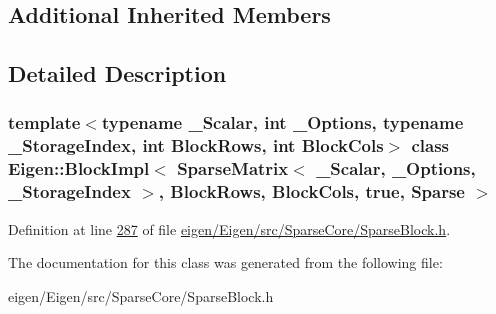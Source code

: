 \subsection*{Additional Inherited Members}


\subsection{Detailed Description}
\subsubsection*{template$<$typename \+\_\+\+Scalar, int \+\_\+\+Options, typename \+\_\+\+Storage\+Index, int Block\+Rows, int Block\+Cols$>$\newline
class Eigen\+::\+Block\+Impl$<$ Sparse\+Matrix$<$ \+\_\+\+Scalar, \+\_\+\+Options, \+\_\+\+Storage\+Index $>$, Block\+Rows, Block\+Cols, true, Sparse $>$}



Definition at line \hyperlink{eigen_2_eigen_2src_2_sparse_core_2_sparse_block_8h_source_l00287}{287} of file \hyperlink{eigen_2_eigen_2src_2_sparse_core_2_sparse_block_8h_source}{eigen/\+Eigen/src/\+Sparse\+Core/\+Sparse\+Block.\+h}.



The documentation for this class was generated from the following file\+:\begin{DoxyCompactItemize}
\item 
eigen/\+Eigen/src/\+Sparse\+Core/\+Sparse\+Block.\+h\end{DoxyCompactItemize}
